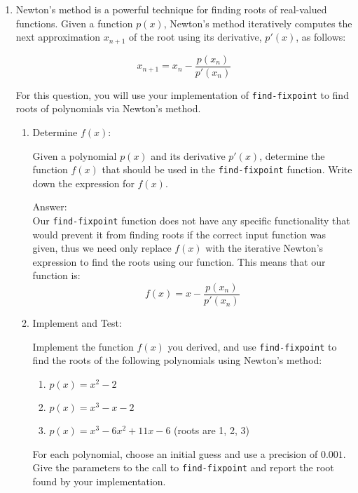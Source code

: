 \documentclass[12pt,letterpaper]{ntdhw}
\begin{document}
\begin{enumerate}
    \item Newton's method is a powerful technique for finding roots of real-valued functions. Given a function \( p(x) \), Newton's method iteratively computes the next approximation \( x_{n+1} \) of the root using its derivative, \( p'(x) \), as follows:

    \[
    x_{n+1} = x_n - \frac{p(x_n)}{p'(x_n)}
    \]

    For this question, you will use your implementation of {\tt find-fixpoint} to find roots of polynomials via Newton's method.
  \begin{enumerate}
    \item Determine \( f(x) \):

    Given a polynomial \( p(x) \) and its derivative \( p'(x) \), determine the function \( f(x) \) that should be used in the {\tt find-fixpoint} function. Write down the expression for \( f(x) \).

    \begin{emph}
      Answer:
      \\ Our {\tt find-fixpoint} function does not have any specific functionality that would prevent it from finding roots if the correct input function was given, thus we need only replace \(f(x) \) with the iterative Newton's expression to find the roots using our function. This means that our function is:
      \[
    f(x) = x - \frac{p(x_n)}{p'(x_n)}
    \]
    \end{emph}

    \item Implement and Test:

    Implement the function \( f(x) \) you derived, and use {\tt find-fixpoint} to find the roots of the following polynomials using Newton's method:
    \begin{enumerate}
      \item \( p(x) = x^2 - 2 \)
      \item \( p(x) = x^3 - x - 2 \)
      \item \( p(x) = x^3 - 6x^2 + 11x - 6 \) (roots are 1, 2, 3)
    \end{enumerate}

    For each polynomial, choose an initial guess and use a precision of \( 0.001 \). Give the parameters to the call to {\tt find-fixpoint} and report the root found by your implementation.


\end{enumerate}
\end{enumerate}
\end{document}
